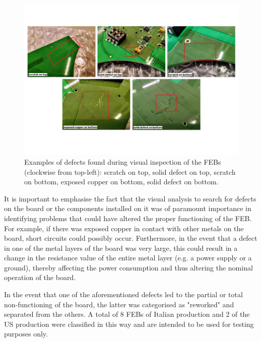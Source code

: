 \begin{figure}[ht]
    \centering
    \includegraphics[width=1\textwidth]{Images/chap2/immagini_difetti.pdf}
    \caption{Examples of defects found during visual inspection of the FEBs (clockwise from top-left): scratch on top, solid defect on top, scratch on bottom, exposed copper on bottom, solid defect on bottom.}
    \label{figScratches}
\end{figure}

\par
It is important to emphasise the fact that the visual analysis to search for defects on the board or the components installed on it was of paramount importance in identifying problems that could have altered the proper functioning of the FEB. For example, if there was exposed copper in contact with other metals on the board, short circuits could possibly occur. Furthermore, in the event that a defect in one of the metal layers of the board was very large, this could result in a change in the resistance value of the entire metal layer (e.g. a power supply or a ground), thereby affecting the power consumption and thus altering the nominal operation of the board.

\par
In the event that one of the aforementioned defects led to the partial or total non-functioning of the board, the latter was categorised as "reworked" and separated from the others. A total of 8 FEBs of Italian production and 2 of the US production were classified in this way and are intended to be used for testing purposes only.


